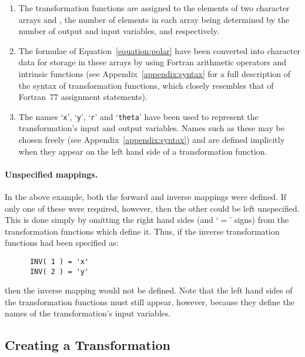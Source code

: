 \begin{enumerate}

\item  The transformation functions are assigned to the elements of two
character arrays  and , the number of elements in
each array being determined by the number of output and input variables,
 and  respectively. 

\item The formulae of Equation~\ref{equation:polar} have been converted into
character data for storage in these arrays by using Fortran arithmetic
operators and intrinsic functions (see Appendix~\ref{appendix:syntax} for a
full description of the syntax of transformation functions, which closely
resembles that of Fortran~77 assignment statements). 

\item The names `\verb#x#', `\verb#y#', `\verb#r#' and `\verb#theta#' have
been used to represent the transformation's input and output variables. 
Names such as these may be chosen freely (see
Appendix~\ref{appendix:syntax}) and are defined implicitly when they appear
on the left hand side of a transformation function. 

\end{enumerate}
\exampledone

\paragraph{Unspecified mappings.}
In the above example, both the forward and inverse mappings were defined. 
If only one of these were required, however, then the other could be left
unspecified. 
This is done simply by omitting the right hand sides (and `$=$' signs) from
the transformation functions which define it. 
Thus, if the inverse transformation functions had been specified as:

\begin{verbatim}
      INV( 1 ) = 'x'
      INV( 2 ) = 'y'
\end{verbatim}

then the inverse mapping would not be defined.
Note that the left hand sides of the transformation functions must still
appear, however, because they define the names of the transformation's input
variables. 


\subsection{Creating a Transformation}

